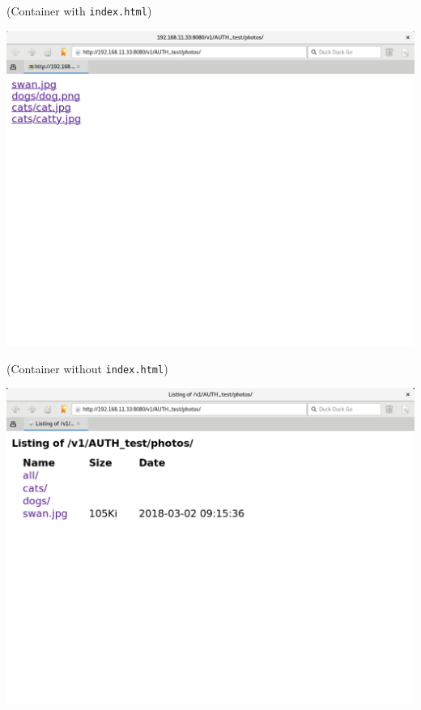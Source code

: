 \documentclass{article}
\begin{document}
\begin{itemize}
\begin{itemize}
(Container with \texttt{index.html})
\begin{center}
\includegraphics[width=.9\linewidth]{./img/container_listing.png}
\end{center}

(Container without \texttt{index.html})
\begin{center}
\includegraphics[width=.9\linewidth]{./img/container_listing_without_html.png}
\end{center}


\end{itemize}
\end{itemize}
\end{document}
